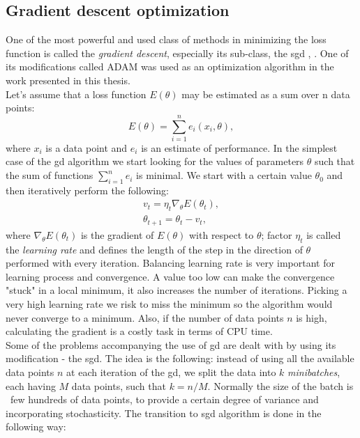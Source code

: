 \subsection{Gradient descent optimization}
One of the most powerful and used class of methods in minimizing the loss function is called the \textit{gradient descent}, \cite{gradient} especially its sub-class, the \gls{sgd} \cite{sgd1}, \cite{sgd2}. One of its modifications called ADAM \cite{kingma2014method} was used as an optimization algorithm in the work presented in this thesis. \\
Let's assume that a loss function $E(\theta)$ may be estimated as a sum over n data points:
\begin{equation}
E(\theta) = \sum^n_{i=1} e_i(x_i,\theta),
\end{equation}
where $x_i$ is a data point and $e_i$ is an estimate of performance. In the simplest case of the \gls{gd} algorithm we start looking for the values of parameters $\theta$ such that the sum of functions $\sum^n_{i=1}e_i$ is minimal. We start with a certain value $\theta_0$ and then iteratively perform the following:
\begin{equation}
\begin{array}{lcl} 
v_t=\eta_t\nabla_{\theta}E(\theta_t),\\
\theta_{t+1}=\theta_t-v_t,
\end{array} 
\end{equation}
where $\nabla_{\theta}E(\theta_t)$ is the gradient of $E(\theta)$ with respect to $\theta$; factor $\eta_t$ is called the \textit{learning rate} and defines the length of the step in the direction of $\theta$ performed with every iteration. Balancing learning rate is very important for learning process and convergence. A value too low can make the convergence "stuck" in a local minimum, it also increases the number of iterations. Picking a very high learning rate we risk to miss the minimum so the algorithm would never converge to a minimum. Also, if the number of data points $n$ is high, calculating the gradient is a costly task in terms of CPU time. \\
Some of the problems accompanying the use of \gls{gd} are dealt with by using its modification - the \gls{sgd}. The idea is the following: instead of using all the available data points $n$ at each iteration of the \gls{gd}, we split the data into $k$ \textit{minibatches}, each having $M$ data points, such that $k = n/M$. Normally the size of the batch is ~few hundreds of data points, to provide a certain degree of variance and incorporating stochasticity. The transition to \gls{sgd} algorithm is done in the following way:
